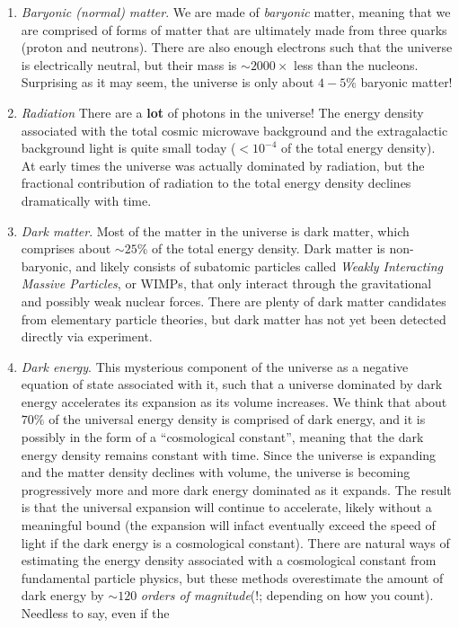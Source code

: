 \documentclass[]{article}
\begin{document}
\begin{enumerate}
\item {\it Baryonic (normal) matter}. We are made of {\it baryonic} matter, meaning
that we are comprised of forms of matter that are ultimately made from three quarks
(proton and neutrons). There are also enough electrons such that the universe is
electrically neutral, but their mass is $\sim2000\times$ less than the nucleons.
Surprising as it may seem, the universe is only about $4-5\%$ baryonic matter!
\item {\it Radiation} There are a {\bf lot} of photons in the universe! The energy
density associated with the total cosmic microwave background and the extragalactic
background light is quite small today ($<10^{-4}$ of the total energy density). At
early times the universe was actually dominated by radiation, but the fractional
contribution of radiation to the total energy density declines dramatically with
time.
\item {\it Dark matter}. Most of the matter in the universe is dark matter, which
comprises about $\sim25\%$ of the total energy density. Dark matter is non-baryonic,
and likely consists of subatomic particles called {\it Weakly Interacting Massive Particles},
or WIMPs, that only interact through the gravitational and possibly weak nuclear forces.
There are plenty of dark matter candidates from elementary particle theories, but dark
matter has not yet been detected directly via experiment.
\item {\it Dark energy}. This mysterious component of the universe as a negative
equation of state associated with it, such that a universe dominated by dark
energy accelerates its expansion as its volume increases. We think that about $70\%$
of the universal energy density is comprised of dark energy, and it is possibly in
the form of a ``cosmological constant'', meaning that the dark energy density remains
constant with time. Since the universe is expanding and the matter density declines
with volume, the universe is becoming progressively more and more dark energy dominated
as it expands. The result is that the universal expansion will continue to accelerate,
likely without a meaningful bound (the expansion will infact eventually exceed the speed
of light if the dark energy is a cosmological constant). There are natural ways of
estimating the energy density associated with a cosmological constant from fundamental
particle physics, but these methods overestimate the amount of dark energy by $\sim120$
{\it orders of magnitude}(!; depending on how you count). Needless to say, even if the

\end{enumerate}
\end{document}
